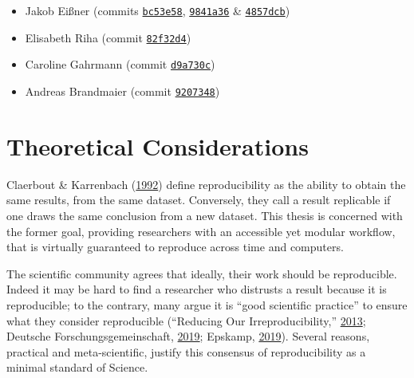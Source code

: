 \documentclass[12pt,a4paper,twoside]{article}
\providecommand{\tightlist}{%
  \setlength{\itemsep}{0pt}\setlength{\parskip}{0pt}}
\begin{document}
\begin{itemize}
\tightlist
\item
  Jakob Eißner (commits \href{https://github.com/aaronpeikert/repro-thesis/commit/bc53e58cf1861b4dbc4447853ad7f3895dd805ea}{\texttt{bc53e58}}, \href{https://github.com/aaronpeikert/repro-thesis/commit/9841a3695b9bc607b95e06e3d30b45116c6681ab}{\texttt{9841a36}} \& \href{https://github.com/aaronpeikert/repro-thesis/commit/4857dcb8536136efa63bbe5efb2da6ae6fc10681}{\texttt{4857dcb}})
\item
  Elisabeth Riha (commit \href{https://github.com/aaronpeikert/repro-thesis/commit/82f32d4d15dd3014dc0cf847166e0b023ea11a8a}{\texttt{82f32d4}})
\item
  Caroline Gahrmann (commit \href{https://github.com/aaronpeikert/repro-thesis/commit/d9a730cb1bdcedef3312bc2be32ad81a3d2a45b9}{\texttt{d9a730c}})
\item
  Andreas Brandmaier (commit \href{https://github.com/aaronpeikert/repro-thesis/commit/9207348f06a56d58637ced8636ad1e0005eb3e14}{\texttt{9207348}})
\end{itemize}

\newpage

\hypertarget{theoretical-considerations}{%
\section{Theoretical Considerations}\label{theoretical-considerations}}

Claerbout \& Karrenbach (\protect\hyperlink{ref-claerboutElectronicDocumentsGive1992}{1992}) define reproducibility as the ability to obtain the same results, from the same dataset.
Conversely, they call a result replicable if one draws the same conclusion from a new dataset.
This thesis is concerned with the former goal, providing researchers with an accessible yet modular workflow, that is virtually guaranteed to reproduce across time and computers.

The scientific community agrees that ideally, their work should be reproducible.
Indeed it may be hard to find a researcher who distrusts a result because it is reproducible; to the contrary, many argue it is ``good scientific practice'' to ensure what they consider reproducible (``Reducing Our Irreproducibility,'' \protect\hyperlink{ref-AnnouncementReducingOur2013}{2013}; Deutsche Forschungsgemeinschaft, \protect\hyperlink{ref-dfg2019}{2019}; Epskamp, \protect\hyperlink{ref-epskamp2019rep}{2019}).
Several reasons, practical and meta-scientific, justify this consensus of reproducibility as a minimal standard of Science.
\end{document}
